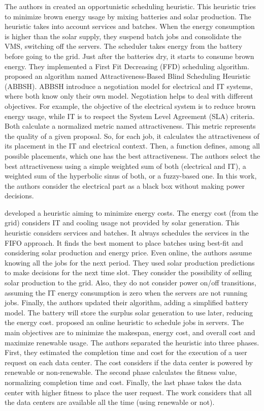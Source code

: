 The authors in \cite{li2017balancing} created an opportunistic scheduling heuristic. This heuristic tries to minimize brown energy usage by mixing batteries and solar production. The heuristic takes into account services and batches. When the energy consumption is higher than the solar supply, they suspend batch jobs and consolidate the VMS, switching off the servers. The scheduler takes energy from the battery before going to the grid. Just after the batteries dry, it starts to consume brown energy. They implemented a First Fit Decreasing (FFD) scheduling algorithm. \citeauthor{grange2018green} \cite{grange2018green} proposed an algorithm named Attractiveness-Based Blind Scheduling Heuristic (ABBSH). ABBSH introduce a negotiation model for electrical and IT systems, where both know only their own model. Negotiation helps to deal with different objectives. For example, the objective of the electrical system is to reduce brown energy usage, while IT is to respect the System Level Agreement (SLA) criteria. Both calculate a normalized metric named attractiveness. This metric represents the quality of a given proposal. So, for each job, it calculates the attractiveness of its placement in the IT and electrical context. Then, a function defines, among all possible placements, which one has the best attractiveness. The authors select the best attractiveness using a simple weighted sum of both (electrical and IT), a weighted sum of the hyperbolic sinus of both, or a fuzzy-based one. In this work, the authors consider the electrical part as a black box without making power decisions.

\citeauthor{haghshenas2020infrastructure} \cite{haghshenas2020infrastructure} developed a heuristic aiming to minimize energy costs. The energy cost (from the grid) considers IT and cooling usage not provided by solar generation. This heuristic considers services and batches. It always schedules the services in the FIFO approach. It finds the best moment to place batches using best-fit and considering solar production and energy price. Even online, the authors assume knowing all the jobs for the next period. They used solar production predictions to make decisions for the next time slot. They consider the possibility of selling solar production to the grid. Also, they do not consider power on/off transitions, assuming the IT energy consumption is zero when the servers are not running jobs. Finally, the authors updated their algorithm, adding a simplified battery model. The battery will store the surplus solar generation to use later, reducing the energy cost. \cite{nayak2021efficient} proposed an online heuristic to schedule jobs in servers. The main objectives are to minimize the makespan, energy cost, and overall cost and maximize renewable usage. The authors separated the heuristic into three phases. First, they estimated the completion time and cost for the execution of a user request on each data center. The cost considers if the data center is powered by renewable or non-renewable. The second phase calculates the fitness value, normalizing completion time and cost. Finally, the last phase takes the data center with higher fitness to place the user request. The work considers that all the data centers are available all the time (using renewable or not).

